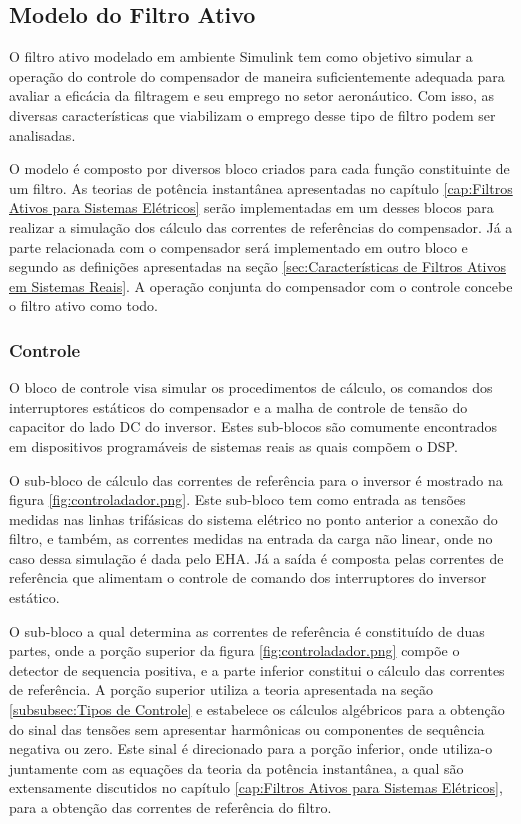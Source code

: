 
\subsection{Modelo do Filtro Ativo}

O filtro ativo modelado em ambiente Simulink tem como objetivo simular a operação do controle do compensador de maneira suficientemente adequada para avaliar a eficácia da filtragem e seu emprego no setor aeronáutico. Com isso, as diversas características que viabilizam o emprego desse tipo de filtro podem ser analisadas.

O modelo é composto por diversos bloco criados para cada função constituinte de um filtro. As teorias de potência instantânea apresentadas no capítulo \ref{cap:Filtros Ativos para Sistemas Elétricos} serão implementadas em um desses blocos para realizar a simulação dos cálculo das correntes de referências do compensador. Já a parte relacionada com o compensador será implementado em outro bloco e segundo as definições apresentadas na seção \ref{sec:Características de Filtros Ativos em Sistemas Reais}. A operação conjunta do compensador com o controle concebe o filtro ativo como todo.

\subsubsection{Controle}

O bloco de controle visa simular os procedimentos de cálculo, os comandos dos interruptores estáticos do compensador e a malha de controle de tensão do capacitor do lado DC do inversor. Estes sub-blocos são comumente encontrados em dispositivos programáveis de sistemas reais as quais compõem o DSP.

O sub-bloco de cálculo das correntes de referência para o inversor é mostrado na figura \ref{fig:controladador.png}. Este sub-bloco tem como entrada as tensões medidas nas linhas trifásicas do sistema elétrico no ponto anterior a conexão do filtro, e também, as correntes medidas na entrada da carga não linear, onde no caso dessa simulação é dada pelo EHA. Já a saída é composta pelas correntes de referência que alimentam o controle de comando dos interruptores do inversor estático.

O sub-bloco a qual determina as correntes de referência é constituído de duas partes, onde a porção superior da figura \ref{fig:controladador.png} compõe o detector de sequencia positiva, e a parte inferior constitui o cálculo das correntes de referência. A porção superior utiliza a teoria apresentada na seção \ref{subsubsec:Tipos de Controle} e estabelece os cálculos algébricos para a obtenção do sinal das tensões sem apresentar harmônicas ou componentes de sequência negativa ou zero. Este sinal é direcionado para a porção inferior, onde utiliza-o juntamente com as equações da teoria da potência instantânea, a qual são extensamente discutidos no capítulo \ref{cap:Filtros Ativos para Sistemas Elétricos}, para  a obtenção das correntes de referência do filtro.


